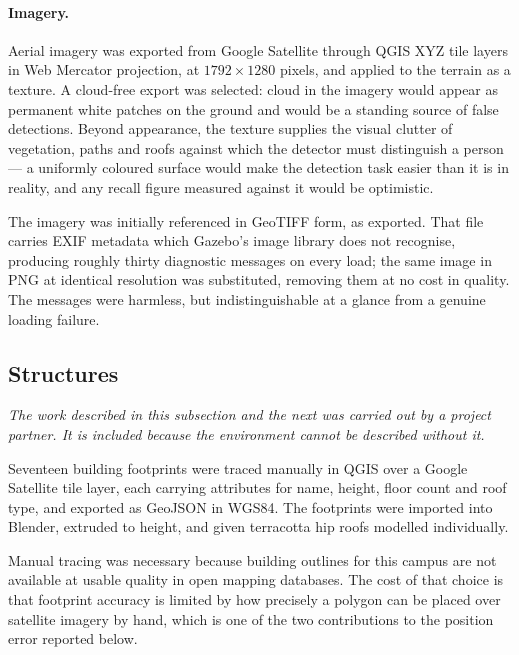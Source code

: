 \paragraph{Imagery.}
Aerial imagery was exported from Google Satellite through QGIS XYZ tile
layers in Web Mercator projection, at $1792 \times 1280$ pixels, and applied
to the terrain as a texture. A cloud-free export was selected: cloud in the
imagery would appear as permanent white patches on the ground and would be a
standing source of false detections. Beyond appearance, the texture supplies
the visual clutter of vegetation, paths and roofs against which the detector
must distinguish a person --- a uniformly coloured surface would make the
detection task easier than it is in reality, and any recall figure measured
against it would be optimistic.

The imagery was initially referenced in GeoTIFF form, as exported. That file
carries EXIF metadata which Gazebo's image library does not recognise,
producing roughly thirty diagnostic messages on every load; the same image in
PNG at identical resolution was substituted, removing them at no cost in
quality. The messages were harmless, but indistinguishable at a glance from
a genuine loading failure.

\subsection{Structures}
\label{sec:world-buildings}

\emph{The work described in this subsection and the next was carried out by a
project partner. It is included because the environment cannot be described
without it.}

Seventeen building footprints were traced manually in QGIS over a Google
Satellite tile layer, each carrying attributes for name, height, floor count
and roof type, and exported as GeoJSON in WGS84. The footprints were imported
into Blender, extruded to height, and given terracotta hip roofs modelled
individually.

Manual tracing was necessary because building outlines for this campus are
not available at usable quality in open mapping databases. The cost of that
choice is that footprint accuracy is limited by how precisely a polygon can
be placed over satellite imagery by hand, which is one of the two
contributions to the position error reported below.


